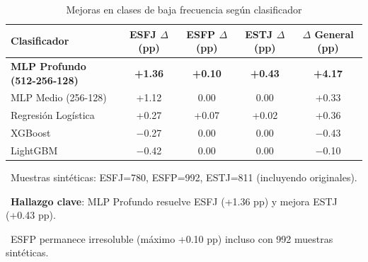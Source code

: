 \begin{table}[htbp]
\centering
\caption{Mejoras en clases de baja frecuencia según clasificador}
\label{tab:rare_class_performance}
\begin{tabular}{lcccc}
\toprule
\textbf{Clasificador} & \textbf{ESFJ $\Delta$ (pp)} & \textbf{ESFP $\Delta$ (pp)} & \textbf{ESTJ $\Delta$ (pp)} & \textbf{$\Delta$ General (pp)} \\
\midrule
\rowcolor{green!20}
\textbf{MLP Profundo (512-256-128)} & \textbf{+1.36} & \textbf{+0.10} & \textbf{+0.43} & \textbf{+4.17} \\
MLP Medio (256-128) & +1.12 & 0.00 & 0.00 & +0.33 \\
Regresión Logística & +0.27 & +0.07 & +0.02 & +0.36 \\
XGBoost & $-$0.27 & 0.00 & 0.00 & $-$0.43 \\
LightGBM & $-$0.42 & 0.00 & 0.00 & $-$0.10 \\
\bottomrule
\end{tabular}
\vspace{0.5em}\footnotesize

\textbullet\ Muestras sintéticas: ESFJ=780, ESFP=992, ESTJ=811 (incluyendo originales).

\textbullet\ \textbf{Hallazgo clave}: MLP Profundo resuelve ESFJ (+1.36 pp) y mejora ESTJ (+0.43 pp).

\textbullet\ ESFP permanece irresoluble (máximo +0.10 pp) incluso con 992 muestras sintéticas.

\end{table}
